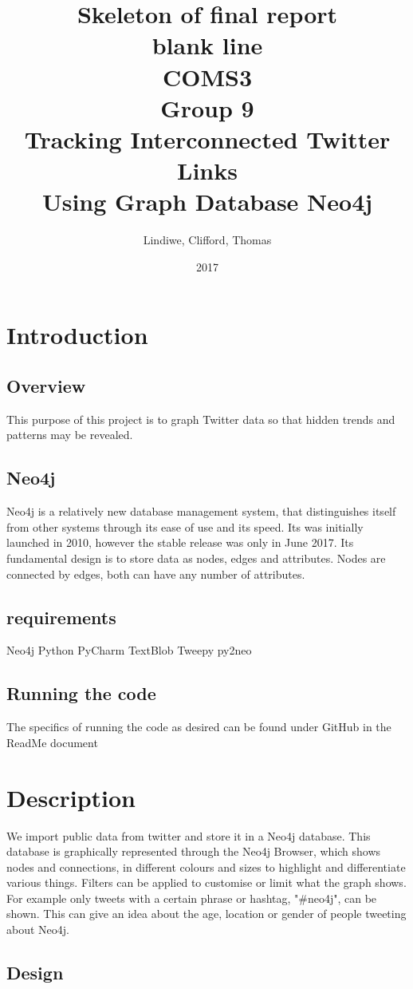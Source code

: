 \documentclass[11pt]{article}
\title{%
Skeleton of final report\\\large
\color{white} blank line\\
\color{black}
COMS3\\
Group 9\\
Tracking Interconnected Twitter Links\\
Using Graph Database Neo4j}
\date{2017}
\author{Lindiwe, Clifford, Thomas}
\begin{document}
\maketitle
{}
\newpage
{}
\section{Introduction}
\subsection{Overview}
This purpose of this project is to graph Twitter data so that hidden trends and patterns may be revealed.
\subsection{Neo4j}
Neo4j is a relatively new database management system, that distinguishes itself from other systems through its ease of use and its speed. Its was initially launched in 2010, however the stable release was only in June 2017. Its fundamental design is to store data as nodes, edges and attributes. Nodes are connected by edges, both can have any number of attributes.
\subsection{requirements}
Neo4j
Python
PyCharm
TextBlob
Tweepy
py2neo
\subsection{Running the code}
The specifics of running the code as desired can be found under GitHub in the ReadMe document
\section{Description}

We import public data from twitter and store it in a Neo4j database. This database is graphically represented through the Neo4j Browser, which shows nodes and connections, in different colours and sizes to highlight and differentiate various things. Filters can be applied to customise or limit what the graph shows. For example only tweets with a certain phrase or hashtag, "\#neo4j", can be shown. This can give an idea about the age, location or gender of people tweeting about Neo4j.

\subsection{Design}
\end{document}
